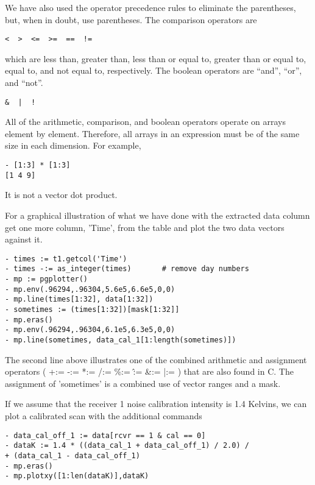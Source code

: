 We have also used the operator precedence rules to eliminate the
parentheses, but, when in doubt, use parentheses. The comparison operators
are

\begin{verbatim}
<  >  <=  >=  ==  !=
\end{verbatim}

which are less than, greater than, less than or equal to, greater than or
equal to, equal to, and not equal to, respectively.  The boolean operators
are ``and'', ``or'', and ``not''.

\begin{verbatim}
&  |  !
\end{verbatim}

All of the arithmetic, comparison, and boolean operators operate on arrays
element by element.  Therefore, all arrays in an expression must be of the
same size in each dimension.  For example,

\begin{verbatim}
- [1:3] * [1:3]
[1 4 9]
\end{verbatim}

It is not a vector dot product.

    For a graphical illustration of what we have done with the extracted
data column get one more column, 'Time', from the table and plot the two
data vectors against it.

\begin{verbatim}
- times := t1.getcol('Time')
- times -:= as_integer(times)		# remove day numbers
- mp := pgplotter()
- mp.env(.96294,.96304,5.6e5,6.6e5,0,0)
- mp.line(times[1:32], data[1:32])
- sometimes := (times[1:32])[mask[1:32]]
- mp.eras()
- mp.env(.96294,.96304,6.1e5,6.3e5,0,0)
- mp.line(sometimes, data_cal_1[1:length(sometimes)])
\end{verbatim}

The second line above illustrates one of the combined arithmetic and
assignment operators ( +:= -:= *:= /:= \%:= \^:= \&:= |:= ) that are also
found in C.  The assignment of 'sometimes' is a combined use of vector
ranges and a mask.

    If we assume that the receiver 1 noise calibration intensity is 1.4
Kelvins, we can plot a calibrated scan with the additional commands

\begin{verbatim}
- data_cal_off_1 := data[rcvr == 1 & cal == 0]
- dataK := 1.4 * ((data_cal_1 + data_cal_off_1) / 2.0) /
+ (data_cal_1 - data_cal_off_1)
- mp.eras()
- mp.plotxy([1:len(dataK)],dataK)
\end{verbatim}

